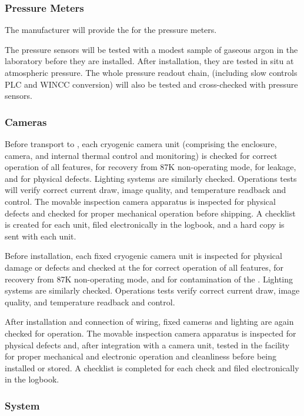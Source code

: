 \subsubsection{Pressure Meters}

The manufacturer will provide the  for the pressure meters.

The pressure sensors will be tested with a modest sample of gaseous
argon in the laboratory before they are installed. After installation,
they are tested in situ at atmospheric pressure. The whole pressure
readout chain, (including slow controls PLC and WINCC conversion) will
also be tested and cross-checked with  pressure sensors.

\subsubsection{Cameras}

Before transport to , each cryogenic camera unit
(comprising the enclosure, camera, and internal thermal control and
monitoring) is checked for correct operation of all features, for
recovery from 87K non-operating mode, for leakage, and for physical
defects. Lighting systems are similarly checked. Operations tests will
verify correct current draw, image quality, and temperature readback
and control. The movable inspection camera apparatus is inspected for
physical defects and checked for proper mechanical operation before
shipping. A checklist is created for each unit, filed electronically
in the  logbook, and a hard copy is sent with each unit.

Before installation, each fixed cryogenic camera unit is inspected for
physical damage or defects and checked at the  for correct
operation of all features, for recovery from 87K non-operating mode,
and for contamination of the . Lighting systems are similarly
checked. Operations tests verify correct current draw, image quality,
and temperature readback and control.

After installation and connection of wiring, fixed cameras and
lighting are again checked for operation.  The movable inspection
camera apparatus is inspected for physical defects and, after
integration with a camera unit, tested in the facility for proper
mechanical and electronic operation and cleanliness before being
installed or stored. A checklist is completed for each  check
and filed electronically in the  logbook.

\subsubsection{ System}

